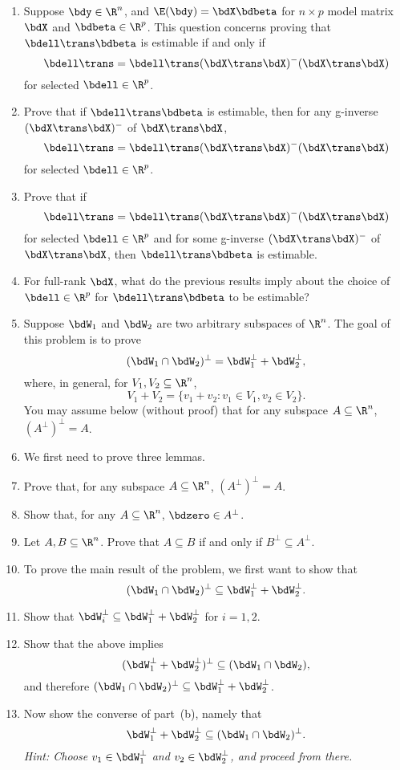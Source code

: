 \begin{enumerate}
\item 
Suppose $\bdy \in \R^n$, and $\E(\bdy) = \bdX\bdbeta$ for
$n\times p$ model matrix $\bdX$ and $\bdbeta \in \R^p$.
This question concerns proving
that $\bdell\trans\bdbeta$ is estimable if and only if
\[
\bdell\trans = \bdell\trans (\bdX\trans\bdX)^{-}(\bdX\trans\bdX) 
\]
for selected $\bdell \in \R^p$.
\be
\item 
Prove that if $\bdell\trans\bdbeta$ is estimable, then
for any g-inverse 
$(\bdX\trans\bdX)^{-}$
of $\bdX\trans\bdX$,
\[
\bdell\trans = \bdell\trans (\bdX\trans\bdX)^{-}(\bdX\trans\bdX) 
\]
for selected $\bdell \in \R^p$.

\item
Prove that if 
\[
\bdell\trans = \bdell\trans (\bdX\trans\bdX)^{-}(\bdX\trans\bdX) 
\]
for selected $\bdell \in \R^p$ and for some g-inverse
$(\bdX\trans\bdX)^{-}$
of $\bdX\trans\bdX$, then
$\bdell\trans\bdbeta$ is estimable.

\item
For full-rank $\bdX$, what do the previous results imply about the choice
of $\bdell \in \R^p$ for $\bdell\trans\bdbeta$ to be estimable?
\ee

\item 
Suppose $\bdW_1$ and $\bdW_2$ are two arbitrary subspaces of $\R^n$.
The goal of this problem is to prove
\[
(\bdW_1 \cap \bdW_2)^\perp
=
\bdW_1^\perp + \bdW_2^\perp,
\]
where, in general, for $V_1, V_2 \subseteq \R^n$,
\[
V_1 + V_2 = \{v_1 + v_2 : v_1\in V_1, v_2\in V_2\}.
\]
You may assume below (without proof) that 
for any subspace $A \subseteq \R^n$, $(A^\perp)^\perp = A$.
\be
\item 
We first need to prove three lemmas.
\be
\item 
Prove that,
for any subspace $A \subseteq \R^n$, $(A^\perp)^\perp = A$.
\item 
Show that, for any $A \subseteq \R^n$, $\bdzero \in A^\perp$.
\item 
Let $A,B \subseteq \R^n$.
Prove that $A\subseteq B$ if and only if 
$B^\perp \subseteq A^\perp$.
\ee
\item 
To prove the main result of the problem, we first want to show that 
\[
(\bdW_1 \cap \bdW_2)^\perp
\subseteq
\bdW_1^\perp + \bdW_2^\perp.
\]
\be
\item 
Show that $\bdW_i^\perp \subseteq \bdW_1^\perp + \bdW_2^\perp$ for $i=1,2$.
\item 
Show that the above implies 
\[
(\bdW_1^\perp + \bdW_2^\perp)^\perp \subseteq (\bdW_1 \cap\bdW_2),
\]
and therefore $(\bdW_1 \cap \bdW_2)^\perp
\subseteq
\bdW_1^\perp + \bdW_2^\perp$.
\ee
\item 
Now show the converse of part~(b), namely that
\[
\bdW_1^\perp + \bdW_2^\perp
\subseteq
(\bdW_1 \cap \bdW_2)^\perp.
\]
{\em Hint:  Choose
$v_1 \in \bdW_1^\perp$ and $v_2 \in \bdW_2^\perp$,
and proceed from there.}
\ee

\end{enumerate}

